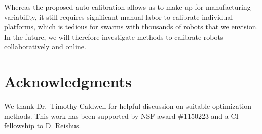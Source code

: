 \documentclass[letterpaper, 10pt, conference]{ieeeconf}
\begin{document}
Whereas the proposed auto-calibration allows us to make up for manufacturing variability, it still requires significant manual labor to calibrate individual platforms, which is tedious for swarms with thousands of robots that we envision. In the future, we will therefore investigate methods to calibrate robots collaboratively and online.  

\section*{Acknowledgments} We thank Dr.\ Timothy Caldwell for helpful discussion on suitable optimization methods. 
This work has been supported by NSF award \#1150223 and a CI fellowship to D. Reishus.




\end{document}
